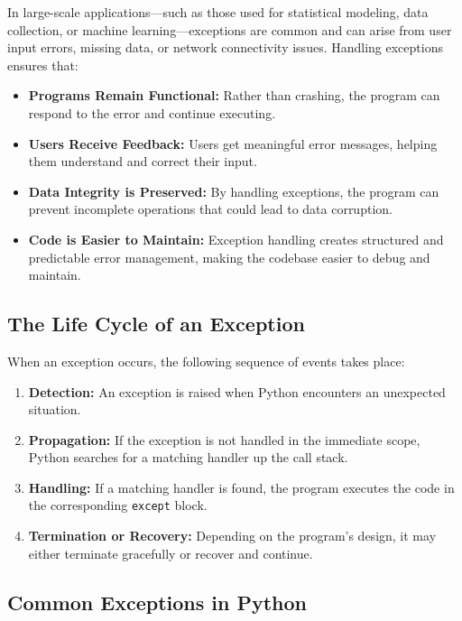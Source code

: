 \documentclass[
  letterpaper,
  DIV=11,
  numbers=noendperiod]{scrreprt}
\providecommand{\tightlist}{%
  \setlength{\itemsep}{0pt}\setlength{\parskip}{0pt}}\usepackage{longtable,booktabs,array}
\begin{document}
In large-scale applications---such as those used for statistical
modeling, data collection, or machine learning---exceptions are common
and can arise from user input errors, missing data, or network
connectivity issues. Handling exceptions ensures that:

\begin{itemize}
\tightlist
\item
  \textbf{Programs Remain Functional:} Rather than crashing, the program
  can respond to the error and continue executing.
\item
  \textbf{Users Receive Feedback:} Users get meaningful error messages,
  helping them understand and correct their input.
\item
  \textbf{Data Integrity is Preserved:} By handling exceptions, the
  program can prevent incomplete operations that could lead to data
  corruption.
\item
  \textbf{Code is Easier to Maintain:} Exception handling creates
  structured and predictable error management, making the codebase
  easier to debug and maintain.
\end{itemize}

\hypertarget{the-life-cycle-of-an-exception}{%
\subsection{The Life Cycle of an
Exception}\label{the-life-cycle-of-an-exception}}

When an exception occurs, the following sequence of events takes place:

\begin{enumerate}
\def\labelenumi{\arabic{enumi}.}
\tightlist
\item
  \textbf{Detection:} An exception is raised when Python encounters an
  unexpected situation.
\item
  \textbf{Propagation:} If the exception is not handled in the immediate
  scope, Python searches for a matching handler up the call stack.
\item
  \textbf{Handling:} If a matching handler is found, the program
  executes the code in the corresponding \texttt{except} block.
\item
  \textbf{Termination or Recovery:} Depending on the program's design,
  it may either terminate gracefully or recover and continue.
\end{enumerate}

\hypertarget{common-exceptions-in-python}{%
\subsection{Common Exceptions in
Python}\label{common-exceptions-in-python}}
\end{document}
